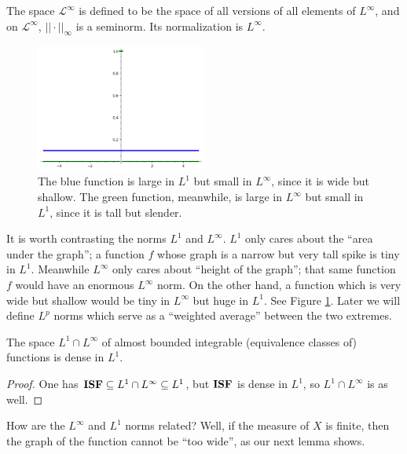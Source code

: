 \begin{subsec}
The space $\mathcal L^{\infty}$ is defined to be the space of all versions of all elements of $L^{\infty}$, and on $\mathcal L^{\infty}$, $||\cdot||_{\infty}$ is a seminorm. Its normalization is $L^{\infty}$.
\end{subsec}

\begin{figure}
\label{Lp comparison figure}
\caption{The blue function is large in $L^1$ but small in $L^\infty$, since it is wide but shallow.
The green function, meanwhile, is large in $L^\infty$ but small in $L^1$, since it is tall but slender.}
\centering \includegraphics[width=0.5\textwidth]{graphics/lp_comparison}
\end{figure}

\begin{subsec}
It is worth contrasting the norms $L^{1}$ and $L^{\infty}$. $L^{1}$ only cares about the ``area under the graph''; a function $f$ whose graph is a narrow but very tall spike is tiny in $L^{1}$. Meanwhile $L^{\infty}$ only cares about ``height of the graph''; that same function $f$ would have an enormous $L^{\infty}$ norm.
On the other hand, a function which is very wide but shallow would be tiny in $L^{\infty}$ but huge in $L^{1}$.
See Figure \ref{Lp comparison figure}.
Later we will define $L^{p}$ norms which serve as a ``weighted average'' between the two extremes.
\end{subsec}

\begin{lemma}
The space $L^{1} \cap L^{\infty}$ of almost bounded integrable (equivalence classes of) functions is dense in $L^{1}$.
\end{lemma}
\begin{proof}
One has $\mathbf{ISF} \subseteq L^{1} \cap L^{\infty} \subseteq L^{1}$, but $\mathbf{ISF}$ is dense in $L^{1}$, so $L^{1} \cap L^{\infty}$ is as well.
\end{proof}

\begin{subsec}
How are the $L^{\infty}$ and $L^{1}$ norms related?
Well, if the measure of $X$ is finite, then the graph of the function cannot be ``too wide'', as our next lemma shows.
\end{subsec}


